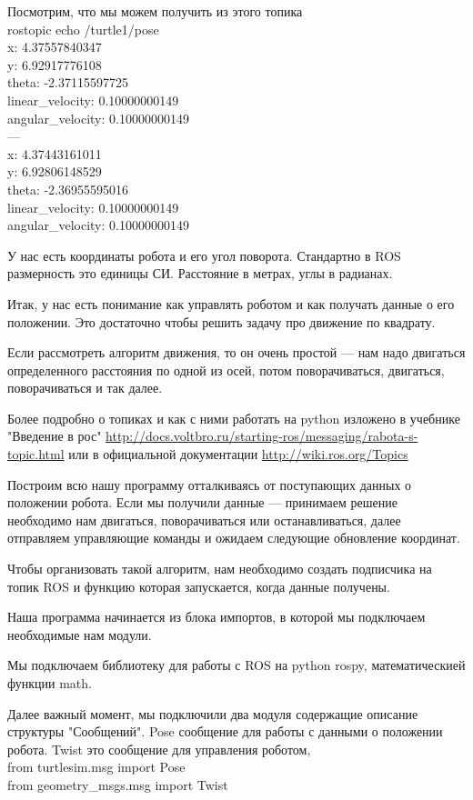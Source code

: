Посмотрим, что мы можем получить из этого топика\\
rostopic echo /turtle1/pose\\
x: 4.37557840347\\
y: 6.92917776108\\
theta: -2.37115597725\\
linear\_velocity: 0.10000000149\\
angular\_velocity: 0.10000000149\\
---\\
x: 4.37443161011\\
y: 6.92806148529\\
theta: -2.36955595016\\
linear\_velocity: 0.10000000149\\
angular\_velocity: 0.10000000149

У нас есть координаты робота и его угол поворота. Стандартно в ROS размерность это единицы СИ. Расстояние в метрах, углы в радианах.

Итак, у нас есть понимание как управлять роботом и как получать данные о его положении. Это достаточно чтобы решить задачу про движение по квадрату.

Если рассмотреть алгоритм движения, то он очень простой — нам надо двигаться определенного расстояния по одной из осей, потом поворачиваться, двигаться, поворачиваться и так далее.

Более подробно о топиках и как с ними работать на python изложено в учебнике "Введение в рос" \url{http://docs.voltbro.ru/starting-ros/messaging/rabota-s-topic.html} или в официальной документации \url{http://wiki.ros.org/Topics}

Построим всю нашу программу отталкиваясь от поступающих данных о положении робота. Если мы получили данные — принимаем решение необходимо нам двигаться, поворачиваться или останавливаться, далее отправляем управляющие команды и ожидаем следующие обновление координат.

Чтобы организовать такой алгоритм, нам необходимо создать подписчика на топик ROS и функцию которая запускается, когда данные получены.

Наша программа начинается из блока импортов, в которой мы подключаем необходимые нам модули.

Мы подключаем библиотеку для работы с ROS на python rospy, математическией функции math.

Далее важный момент, мы подключили два модуля содержащие описание структуры "Сообщений". Pose сообщение для работы с данными о положении робота. Twist это сообщение для управления роботом,\\
from turtlesim.msg import Pose\\
from geometry\_msgs.msg import Twist

